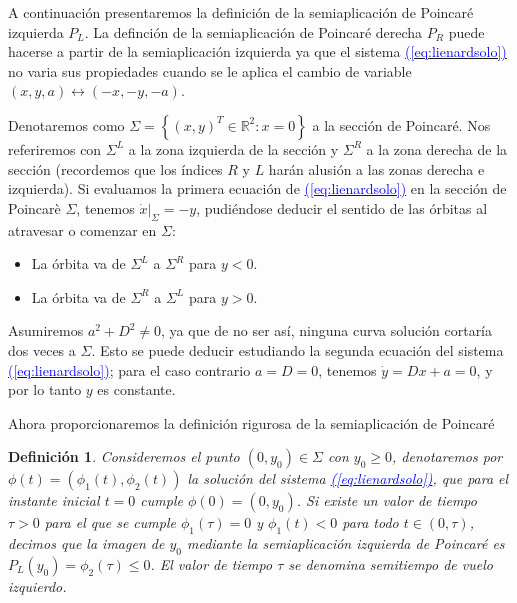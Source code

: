 \documentclass[12pt,a4paper]{report} %
\newtheorem{definicion}{Definición}[chapter]
\newtheorem{definicion}{Definición}[chapter] %
\newcommand{\eref}[1]{\hyperref[#1]{\textcolor{blue}{(\ref*{#1})}}}
\newcommand{\eref}[1]{\hyperref[#1]{\textcolor{blue}{\textit{(\ref*{#1})}}}}
\begin{document}
		\vspace{0.5cm} A continuación presentaremos la definición de la semiaplicación de Poincaré izquierda $P_L$. La definción de la semiaplicación de Poincaré derecha $P_R$ puede hacerse a partir de la semiaplicación izquierda ya que el sistema \eref{eq:lienardsolo} no varia sus propiedades cuando se le aplica el cambio de variable $(x,y,a)\longleftrightarrow(-x,-y,-a)$. 
	
	\newpage
	
	Denotaremos como $\varSigma=\left\{(x,y)^T\in \mathbb{R}^2:x=0\right\}$ a la sección de Poincaré. Nos referiremos con $\varSigma^L$ a la zona izquierda de la sección y $\varSigma^R$ a la zona derecha de la sección (recordemos que los índices $R$ y $L$ harán alusión a las zonas derecha e izquierda). Si evaluamos la primera ecuación de \eref{eq:lienardsolo} en la sección de Poincarè $\varSigma$, tenemos $\dot{x}|_{\varSigma}=-y$, pudiéndose deducir el sentido de las órbitas al atravesar o comenzar en $\varSigma$:
	
	\begin{itemize}
		\item La órbita va de $\varSigma^L$ a $\varSigma^R$ para $y<0$.
		\item La órbita va de $\varSigma^R$ a $\varSigma^L$ para $y>0$.
	\end{itemize}
	
	\vspace{0.5cm}\noindent Asumiremos $a^2+D^2\neq0$, ya que de no ser así, ninguna curva solución cortaría dos veces a $\varSigma$. Esto se puede deducir estudiando la segunda ecuación del sistema \eref{eq:lienardsolo}; para el caso contrario $a=D=0$, tenemos $\dot{y}=Dx+a=0$, y por lo tanto $y$ es constante.
	
	\vspace{0.5cm}\noindent Ahora proporcionaremos la definición rigurosa de la semiaplicación de Poincaré

	\vspace{0.5cm}
	\begin{definicion}
		\label{def6}
		Consideremos el punto $(0,y_0)\in \varSigma$ con $y_0\geq0$, denotaremos por $\phi(t)=(\phi_1(t),\phi_2(t))$ la solución del sistema \eref{eq:lienardsolo}, que para el instante inicial $t=0$ cumple $\phi(0)=(0,y_0)$. Si existe un valor de tiempo $\tau>0$ para el que se cumple $\phi_1(\tau)=0$ y $\phi_1(t)<0$ para todo $t\in(0,\tau)$, decimos que la imagen de $y_0$ mediante la semiaplicación izquierda de Poincaré es $P_L(y_0)=\phi_2(\tau)\leq0$. El valor de tiempo $\tau$ se denomina semitiempo de vuelo izquierdo.
	\end{definicion}
	
\end{document}
